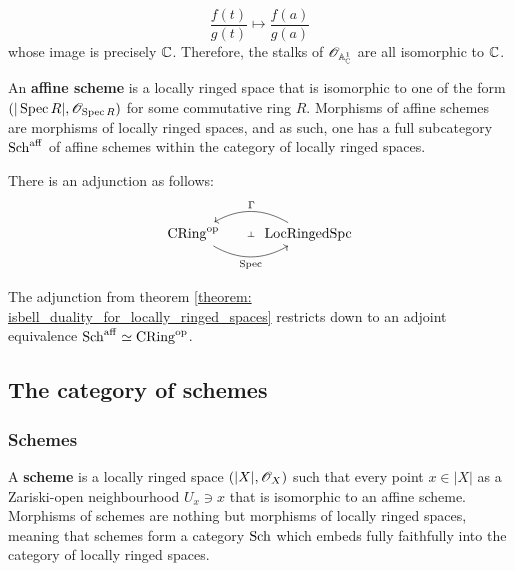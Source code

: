 \begin{example}
\begin{enumerate}
		                    $$\frac{f(t)}{g(t)} \mapsto \frac{f(a)}{g(a)}$$
	                    whose image is precisely $\mathbb{C}$. Therefore, the stalks of $\mathscr{O}_{\mathbb{A}^1_{\mathbb{C}}}$ are all isomorphic to $\mathbb{C}$.
			        \end{enumerate}
            \end{example}
        
            \begin{definition} \label{def: affine_schemes}
                An \textbf{affine scheme} is a locally ringed space that is isomorphic to one of the form $(|\operatorname{Spec} R|, \mathscr{O}_{\operatorname{Spec} R})$ for some commutative ring $R$. Morphisms of affine schemes are morphisms of locally ringed spaces, and as such, one has a full subcategory $\mathrm{Sch}^{\mathrm{aff}}$ of affine schemes within the category of locally ringed spaces. 
            \end{definition}
            
            \begin{theorem} \label{theorem: isbell_duality_for_locally_ringed_spaces}
                There is an adjunction as follows:
                    $$
                        \begin{tikzcd}
                        	{\Cring^{\op}} & \Loc\Ringed\Spc
                        	\arrow[""{name=0, anchor=center, inner sep=0}, "\Spec"', bend right, from=1-1, to=1-2]
                        	\arrow[""{name=1, anchor=center, inner sep=0}, "\Gamma"', bend right, from=1-2, to=1-1]
                        	\arrow["\dashv"{anchor=center, rotate=-90}, draw=none, from=1, to=0]
                        \end{tikzcd}
                    $$
            \end{theorem}
            \begin{corollary}
                The adjunction from theorem \ref{theorem: isbell_duality_for_locally_ringed_spaces} restricts down to an adjoint equivalence $\mathrm{Sch}^{\mathrm{aff}} \simeq \mathrm{CRing}^{\mathrm{op}}$.
            \end{corollary}

    \subsection{The category of schemes}
        \subsubsection{Schemes}
            \begin{definition}[Schemes] \label{def: schemes}
                A \textbf{scheme} is a locally ringed space $(|X|, \mathscr{O}_X)$ such that every point $x \in |X|$ as a Zariski-open neighbourhood $U_x \ni x$ that is isomorphic to an affine scheme. Morphisms of schemes are nothing but morphisms of locally ringed spaces, meaning that schemes form a category $\mathrm{Sch}$ which embeds fully faithfully into the category of locally ringed spaces.
            \end{definition}
            
